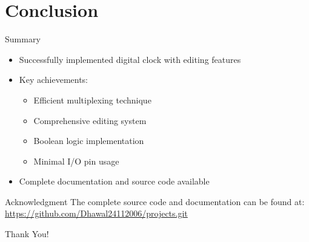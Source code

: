 \documentclass{beamer}
\begin{document}
\section{Conclusion}
\begin{frame}{Summary}
    \begin{itemize}
        \item Successfully implemented digital clock with editing features
        \item Key achievements:
        \begin{itemize}
            \item Efficient multiplexing technique
            \item Comprehensive editing system
            \item Boolean logic implementation
            \item Minimal I/O pin usage
        \end{itemize}
        \item Complete documentation and source code available
    \end{itemize}
\end{frame}

\begin{frame}{Acknowledgment}
    \centering
    \Large
    The complete source code and documentation can be found at:\\
    \vspace{0.5cm}
    \url{https://github.com/Dhawal24112006/projects.git}
    
    \vspace{1cm}
    \normalsize
    Thank You!
\end{frame}
\end{document}
